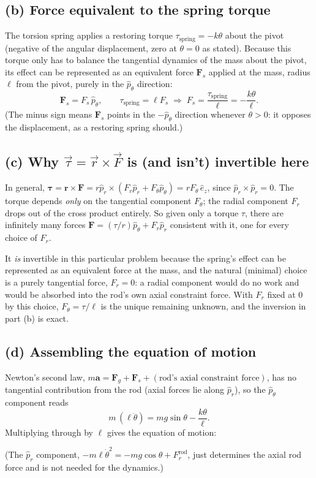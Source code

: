 \documentclass[11pt]{article}
\newcommand{\thd}{\dot\theta}
\newcommand{\thdd}{\ddot\theta}
\newcommand{\ans}[1]{\begin{center}\fbox{\rule[-1.2ex]{0pt}{3.6ex}\hspace{0.6em}$\displaystyle #1$\hspace{0.6em}}\end{center}}
\begin{document}
\subsection*{(b) Force equivalent to the spring torque}
The torsion spring applies a restoring torque $\tau_{\text{spring}} = -k\theta$ about the pivot (negative of the angular displacement, zero at $\theta=0$ as stated). Because this torque only has to balance the tangential dynamics of the mass about the pivot, its effect can be represented as an equivalent force $\mathbf F_s$ applied at the mass, radius $\ell$ from the pivot, purely in the $\hat p_\theta$ direction:
\[
  \mathbf F_s = F_s\,\hat p_\theta, \qquad \tau_{\text{spring}} = \ell F_s \;\Longrightarrow\; F_s = \frac{\tau_{\text{spring}}}{\ell} = -\frac{k\theta}{\ell}.
\]
(The minus sign means $\mathbf F_s$ points in the $-\hat p_\theta$ direction whenever $\theta>0$: it opposes the displacement, as a restoring spring should.)

\subsection*{(c) Why $\vec\tau=\vec r\times\vec F$ is (and isn't) invertible here}
In general, $\boldsymbol\tau = \mathbf r\times\mathbf F = r\hat p_r\times(F_r\hat p_r + F_\theta\hat p_\theta) = rF_\theta\,\hat e_z$, since $\hat p_r\times\hat p_r=0$. The torque depends \emph{only} on the tangential component $F_\theta$; the radial component $F_r$ drops out of the cross product entirely. So given only a torque $\tau$, there are infinitely many forces $\mathbf F = (\tau/r)\hat p_\theta + F_r\hat p_r$ consistent with it, one for every choice of $F_r$.

It \emph{is} invertible in this particular problem because the spring's effect can be represented as an equivalent force at the mass, and the natural (minimal) choice is a purely tangential force, $F_r=0$: a radial component would do no work and would be absorbed into the rod's own axial constraint force. With $F_r$ fixed at $0$ by this choice, $F_\theta = \tau/\ell$ is the unique remaining unknown, and the inversion in part (b) is exact.

\subsection*{(d) Assembling the equation of motion}
Newton's second law, $m\mathbf a = \mathbf F_g + \mathbf F_s + (\text{rod's axial constraint force})$, has no tangential contribution from the rod (axial forces lie along $\hat p_r$), so the $\hat p_\theta$ component reads
\[
  m\,(\ell\thdd) = mg\sin\theta - \frac{k\theta}{\ell}.
\]
Multiplying through by $\ell$ gives the equation of motion:
\ans{m\ell^2\,\thdd = mg\ell\sin\theta - k\theta
\qquad\Longleftrightarrow\qquad
\thdd = \frac{g}{\ell}\sin\theta - \frac{k}{m\ell^2}\,\theta.}
(The $\hat p_r$ component, $-m\ell\thd^2 = -mg\cos\theta + F_r^{\text{rod}}$, just determines the axial rod force and is not needed for the dynamics.)
\end{document}
